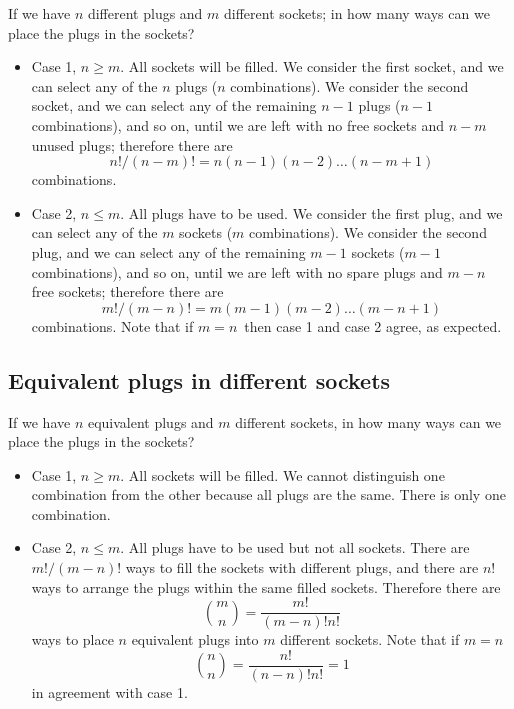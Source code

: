 \documentclass[justified,sixbynine]{tufte-book}
\theoremstyle{plain}%
\theoremstyle{definition}
\theoremstyle{remark}
\begin{document}
\begin{fullwidth}
If we have $n$ different plugs and $m$ different sockets; in how many ways
can we place the plugs in the sockets?

\begin{itemize}
\item  Case 1, $n\geq m$. All sockets will be filled. We consider the first
socket, and we can select any of the $n$ plugs ($n$ combinations). We
consider the second socket, and we can select any of the remaining $n-1$
plugs ($n-1$ combinations), and so on, until we are left with no free sockets
and $n-m$ unused plugs; therefore there are
\begin{equation}
n!/(n-m)!=n(n-1)(n-2)\dots(n-m+1)
\end{equation}
combinations.

\item  Case 2, $n\leq m$. All plugs have to be used. We consider the first
plug, and we can select any of the $m$ sockets ($m$ combinations). We
consider the second plug, and we can select any of the remaining $m-1$
sockets ($m-1$ combinations), and so on, until we are left with no spare
plugs and $m-n$ free sockets; therefore there are
\begin{equation}
m!/(m-n)!=m(m-1)(m-2)\dots(m-n+1)
\end{equation}
combinations. Note that if $m=n\,$ then case 1 and case 2 agree, as
expected.
\end{itemize}

\goodbreak\subsection{Equivalent plugs in different sockets}

If we have $n$ equivalent plugs and $m$ different sockets, in how many ways
can we place the plugs in the sockets?

\begin{itemize}
\item  Case 1, $n\geq m$. All sockets will be filled. We cannot distinguish
one combination from the other because all plugs are the same. There is only
one combination.

\item  Case 2, $n\leq m$. All plugs have to be used but not all sockets.
There are $m!/(m-n)!$ ways to fill the sockets with different plugs, and
there are $n!$ ways to arrange the plugs within the same filled sockets.
Therefore there are
\begin{equation}
\binom mn=\frac{m!}{(m-n)!n!}
\end{equation}
ways to place $n$ equivalent plugs into $m$ different sockets. Note that if $%
m=n$%
\begin{equation}
\binom nn=\frac{n!}{(n-n)!n!}=1
\end{equation}
in agreement with case 1.
\end{itemize}


\end{fullwidth}
\end{document}
